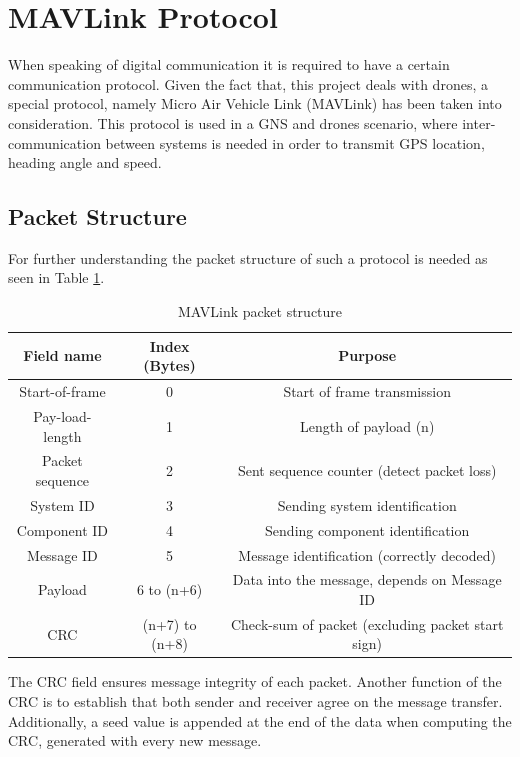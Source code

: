 \section{MAVLink Protocol}\label{sec:mavlink}
When speaking of digital communication it is required to have a certain communication protocol. Given the fact that, this project deals with drones, a special protocol, namely Micro Air Vehicle Link (MAVLink) has been taken into consideration. This protocol is used in a GNS and drones scenario, where inter-communication between systems is needed in order to transmit GPS location, heading angle and speed.  

\subsection{Packet Structure}
For further understanding the packet structure of such a protocol is needed as seen in Table \ref{tab:mavlink}.

\begin{table}[h]
	\centering
	\begin{tabular}{|c||c|c|}
		\hline
		Field name       & Index (Bytes)  & Purpose											     \\ \hline\hline
		Start-of-frame   &      0         & Start of frame transmission 							   \\ \hline
		Pay-load-length  &      1         & Length of payload (n)       							   \\ \hline
		Packet sequence  &      2    	  & Sent sequence counter (detect packet loss)                 \\ \hline
		System ID        & 		3		  & Sending system identification 							   \\ \hline
		Component ID     & 		4 		  & Sending component identification 						   \\ \hline
		Message ID       & 		5 		  & Message identification (correctly decoded)      		   \\ \hline
		Payload          &   6 to (n+6)   & Data into the message, depends on Message ID        	   \\ \hline
		CRC              & (n+7) to (n+8) & Check-sum of packet (excluding packet start sign)          \\ \hline
	\end{tabular}
	\caption{MAVLink packet structure}
	\label{tab:mavlink}
\end{table}

The CRC field ensures message integrity of each packet. Another function of the CRC is to establish that both sender and receiver agree on the message transfer. Additionally, a seed value is appended at the end of the data when computing the CRC, generated with every new message.

